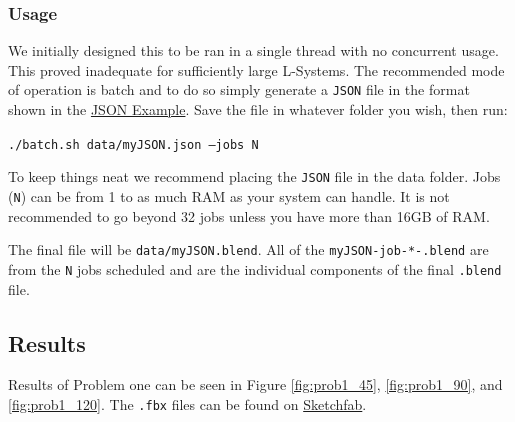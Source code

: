 \subsubsection{Usage}
We initially designed this to be ran in a single thread with no concurrent 
usage. This proved inadequate for sufficiently large L-Systems. The recommended 
mode of operation is batch and to do so simply generate a \texttt{JSON} file in 
the format shown in the \hyperref[code:prob1_json]{JSON Example}. Save the file 
in whatever folder you wish, then run:

\texttt{./batch.sh data/myJSON.json --jobs N}

To keep things neat we recommend placing the \texttt{JSON} file in the data 
folder. Jobs (\texttt{N}) can be from 1 to as much RAM as your system can 
handle. It is not recommended to go beyond 32 jobs unless you have more than 
16GB of RAM.

The final file will be \texttt{data/myJSON.blend}. All of the 
\texttt{myJSON-job-*-.blend} are from the \texttt{N} jobs scheduled and are the 
individual components of the final \texttt{.blend} file.



\subsection{Results}
Results of Problem one can be seen in Figure \ref{fig:prob1_45}, 
\ref{fig:prob1_90}, and \ref{fig:prob1_120}. The \texttt{.fbx} files can be 
found on 
\href{https://sketchfab.com/macattackftw/collections/problem-1}{Sketchfab}.

